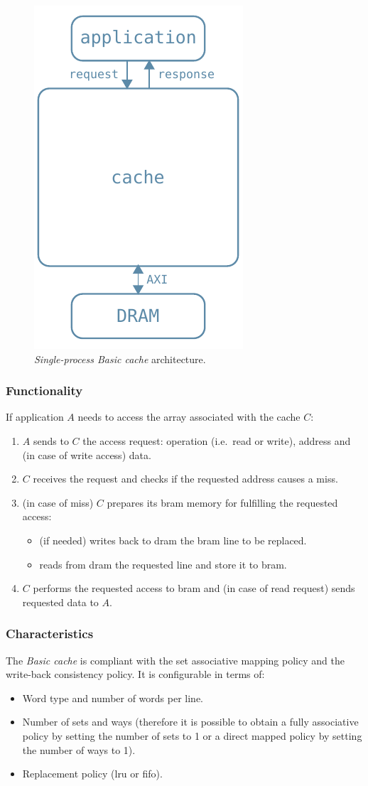 \documentclass[11pt,a4paper,oneside]{memoir}
\begin{document}
\begin{figure}
	\centering
	\includegraphics[width=.3\textwidth]{single_proc_basic_arch}
	\caption{\emph{Single-process Basic cache} architecture.}
	\label{fig:single_proc_basic_arch}
\end{figure}

\subsubsection{Functionality}
If application $A$ needs to access the array associated with the cache $C$:
\begin{enumerate}
	\item $A$ sends to $C$ the access request: operation (i.e.\ read or
		write), address and (in case of write access) data.
	\item $C$ receives the request and checks if the requested address
		causes a miss.
	\item (in case of miss) $C$ prepares its \ac{bram} memory for fulfilling
		the requested access:
		\begin{itemize}
			\item (if needed) writes back to \ac{dram} the \ac{bram}
				line to be replaced.
			\item reads from \ac{dram} the requested line and store
				it to \ac{bram}.
		\end{itemize}
	\item $C$ performs the requested access to \ac{bram} and (in case of
		read request) sends requested data to $A$.
\end{enumerate}

\subsubsection{Characteristics}
The \emph{Basic cache} is compliant with the set associative mapping policy and
the write-back consistency policy.
It is configurable in terms of:
\begin{itemize}
	\item Word type and number of words per line.
	\item Number of sets and ways (therefore it is possible to obtain a
		fully associative policy by setting the number of sets to 1 or
		a direct mapped policy by setting the number of ways to 1).
	\item Replacement policy (\acl{lru} or \acl{fifo}).
\end{itemize}
\end{document}
